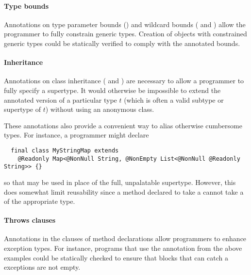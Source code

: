 \documentclass[10pt]{article}
\begin{document}

\paragraph{Type bounds}
Annotations on type parameter bounds ()
and wildcard bounds ( and )
allow the programmer to fully constrain generic types.  Creation of
objects with constrained generic types could be statically verified to
comply with the annotated bounds.

\paragraph{Inheritance}
Annotations on class inheritance ( and
) are necessary to allow a programmer to fully
specify a supertype. It would otherwise be impossible to extend the
annotated version of a particular type $t$ (which is often a valid
subtype or supertype of $t$) without using an anonymous class.

\noindent
\label{class-inheritance-annotations}
These annotations also provide a convenient way to alias otherwise
cumbersome types. For instance, a programmer might declare

\preverbnegspace
\begin{Verbatim}
  final class MyStringMap extends
    @Readonly Map<@NonNull String, @NonEmpty List<@NonNull @Readonly String>> {}
\end{Verbatim}

\noindent
so that  may be used in place of the full,
unpalatable supertype.  However, this does somewhat limit reusability
since a method declared to take a  cannot take a
 of the appropriate type.

\paragraph{Throws clauses}
Annotations in the  clauses of method declarations allow
programmers to enhance exception types. For instance, programs that
use the  annotation from the above examples could be
statically checked to ensure that  blocks that can catch a
 exceptions are not empty.
\end{document}

